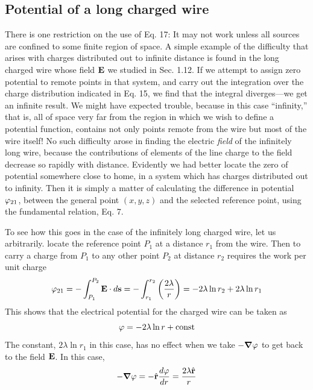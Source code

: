 \subsection{Potential of a long charged wire}

There is one restriction on the
use of Eq. 17: It may not work unless all sources are confined to some
finite region of space. A simple example of the difficulty that arises
with charges distributed out to infinite distance is found in the long
charged wire whose field $\mathbf{E}$ we studied in Sec. 1.12. If we attempt to
assign zero potential to remote points in that system, and carry out
the integration over the charge distribution indicated in Eq. 15, we
find that the integral diverges---we get an infinite result. We might
have expected trouble, because in this case ``infinity,'' that is, all of
space very far from the region in which we wish to define a potential
function, contains not only points remote from the wire but most of
the wire itself! No such difficulty arose in finding the electric \emph{field} of
the infinitely long wire, because the contributions of elements of the
line charge to the field decrease so rapidly with distance. Evidently
we had better locate the zero of potential somewhere close to home,
in a system which has charges distributed out to infinity. Then it is
simply a matter of calculating the difference in potential $\varphi_{21}$, between
the general point $(x,y,z)$ and the selected reference point, using the
fundamental relation, Eq. 7.

To see how this goes in the case of the infinitely long charged wire,
let us arbitrarily. locate the reference point $P_1$ at a distance $r_1$ from
the wire. Then to carry a charge from $P_1$ to any other point $P_2$ at
distance $r_2$ requires the work per unit charge
\begin{equation}
  \varphi_{21} = -\int_{P_1}^{P_2} \mathbf{E}\cdot d\mathbf{s}
            = -\int_{r_1}^{r_2} \left(\frac{2\lambda}{r}\right)
            = -2\lambda\ln r_2 + 2\lambda \ln r_1
\end{equation}
This shows that the electrical potential for the charged wire can be
taken as
\begin{equation}
  \varphi = -2\lambda\ln r + \text{const}
\end{equation}
The constant, $2\lambda\ln r_1$ in this case, has no effect when we take $-\boldsymbol{\nabla}\varphi$
to get back to the field $\mathbf{E}$. In this case,
\begin{equation}
  -\boldsymbol{\nabla}\varphi = -\hat{\mathbf{r}}\frac{d\varphi}{d r} = \frac{2\lambda\hat{\mathbf{r}}}{r}
\end{equation}


